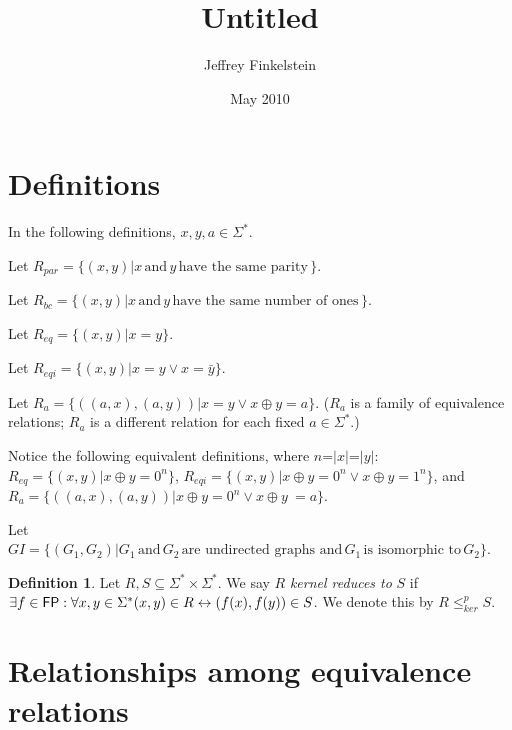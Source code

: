 \documentclass{article}
\author{Jeffrey Finkelstein}
\date{May 2010}
\title{Untitled}
\theoremstyle{definition}
\newtheorem{definition}{Definition}[section]
\newcommand{\plain}[1]{\,\textrm{#1}\,}
\newcommand{\sigmastar}{\Sigma^{*}}
\newcommand{\kr}{\leq^{p}_{ker}}
\begin{document}
\maketitle

\section{Definitions}

In the following definitions, $x,y,a\in{\Sigma^*}$.

Let $R_{par}=\{(x,y)|x \plain{and} y \plain{have the same parity}\}$.

Let $R_{bc}=\{(x,y)|x \plain{and} y \plain{have the same number of ones}\}$.

Let $R_{eq}=\{(x,y)|x = y\}$.

Let $R_{eqi}=\{(x,y)|x = y \lor x = \bar{y}\}$.

Let $R_{a}=\{((a,x),(a,y))|x = y \lor x \oplus y = a\}$. ($R_{a}$ is a family
of equivalence relations; $R_{a}$ is a different relation for each fixed $a\in\sigmastar$.)

Notice the following equivalent definitions, where $n$=$|x|$=$|y|$:
$R_{eq}=\{(x,y)|x \oplus y = 0^n\}$, $R_{eqi}=\{(x,y)|x \oplus y = 0^n \lor x
\oplus y = 1^n\}$, and $R_{a}=\{((a,x),(a,y))|x \oplus y = 0^n \lor x \oplus
y\ = a\}$.

Let $GI=\{(G_1,G_2)|G_1 \plain{and} G_2 \plain{are undirected graphs and} G_1
\plain{is isomorphic to} G_2\}$.

\begin{definition}Let $R,S\subseteq\sigmastar\times\sigmastar$. We say $R$
  \textit{kernel reduces to} $S$ if $\exists f\in\FP:\forall x,y\in\sigmastar
  (x,y)\in R \leftrightarrow (f(x),f(y))\in S$. We denote this by $R\kr
  S$.\end{definition}

\section{Relationships among equivalence relations}
\end{document}
